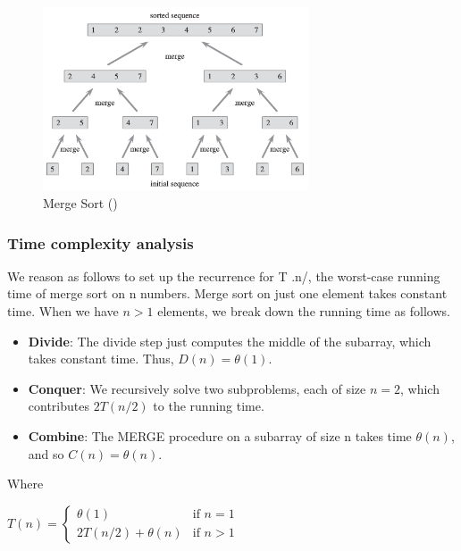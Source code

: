\begin{center}
    \begin{figure}[H]
        \centering
        \includegraphics[width=0.7\textwidth]{assets/merge_sort.png}
        \caption{Merge Sort (\cite{cormen2022introduction})}
    \end{figure}
\end{center}

\subsubsection*{Time complexity analysis}

We reason as follows to set up the recurrence for T .n/, the worst-case running
time of merge sort on n numbers. Merge sort on just one element takes constant
time. When we have $n > 1$ elements, we break down the running time as follows.
\begin{itemize}
    \item \textbf{Divide}: The divide step just computes the middle of the subarray, which takes constant time. Thus, $D(n) = \theta(1)$.
    \item \textbf{Conquer}: We recursively solve two subproblems, each of size $n=2$, which contributes $2T(n/2)$ to the running time.
    \item \textbf{Combine}: The MERGE procedure on a subarray of size n takes time $\theta(n)$, and so $C(n) = \theta(n)$.
\end{itemize}

Where 

\begin{center}
    $T(n) = \begin{cases} 
        \theta(1) & \text{if $n = 1$} \\
        2T(n/2) + \theta(n) & \text{if $n > 1$}
    \end{cases}$
\end{center}

